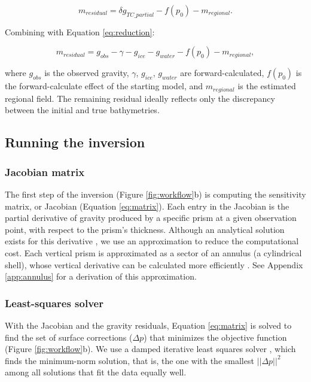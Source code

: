 \documentclass[tc, manuscript]{copernicus}
\begin{document}
\begin{equation} \label{eq:residual_misfit}
    m_{residual} = \delta g_{TC\_partial} - f(p_0) - m_{regional}.
\end{equation}

Combining with Equation \ref{eq:reduction}:

\begin{equation} \label{eq:residual_misfit2}
    m_{residual} = g_{obs} - \gamma - g_{ice} - g_{water} - f(p_0)  - m_{regional},
\end{equation}

where $g_{obs}$ is the observed gravity, $\gamma$, $g_{ice}$, $g_{water}$ are forward-calculated, $f(p_0)$ is the forward-calculate effect of the starting model, and $m_{regional}$ is the estimated regional field. The remaining residual ideally reflects only the discrepancy between the initial and true bathymetries.

\subsection{Running the inversion}

\subsubsection{Jacobian matrix}
The first step of the inversion (Figure \ref{fig:workflow}b) is computing the sensitivity matrix, or Jacobian (Equation \ref{eq:matrix}). Each entry in the Jacobian is the partial derivative of gravity produced by a specific prism at a given observation point, with respect to the prism's thickness. Although an analytical solution exists for this derivative \citep{nagygravitational2000}, we use an approximation to reduce the computational cost. Each vertical prism is approximated as a sector of an annulus (a cylindrical shell), whose vertical derivative can be calculated more efficiently \citep{mccubbineairborne2016}. See Appendix \ref{app:annulus} for a derivation of this approximation.

\subsubsection{Least-squares solver}
With the Jacobian and the gravity residuals, Equation \ref{eq:matrix} is solved to find the set of surface corrections ($\Delta p$) that minimizes the objective function (Figure \ref{fig:workflow}b). We use a damped iterative least squares solver \citep[LSQR;][]{paigelsqr1982}, which finds the minimum-norm solution, that is, the one with the smallest $||\Delta p||^2$ among all solutions that fit the data equally well.
\end{document}
